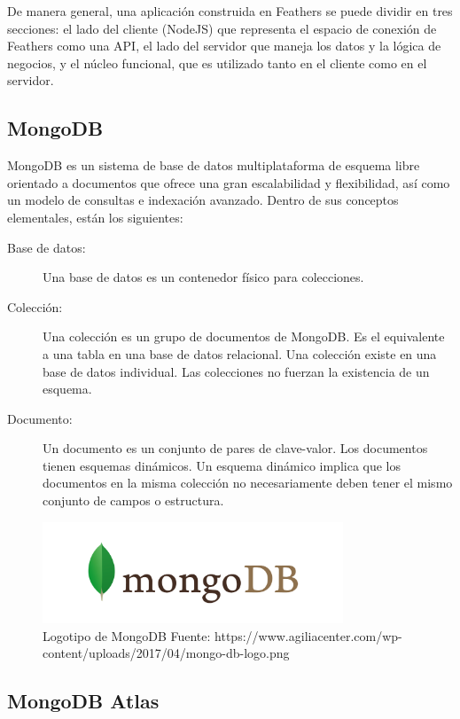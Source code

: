 De manera general, una aplicación construida en Feathers se puede dividir en tres secciones: el lado del cliente (NodeJS) que representa el espacio de conexión de Feathers como una API, el lado del servidor que maneja los datos y la lógica de negocios, y el núcleo funcional, que es utilizado tanto en el cliente como en el servidor.

\subsection{MongoDB}

MongoDB \cite{mongodb} es un sistema de base de datos multiplataforma de esquema libre orientado a documentos que ofrece una gran escalabilidad y flexibilidad, así como un modelo de consultas e indexación avanzado. Dentro de sus conceptos elementales, están los siguientes:

\begin{description}
    \item[Base de datos:] Una base de datos es un contenedor físico para colecciones.
    \item[Colección:] Una colección es un grupo de documentos de MongoDB. Es el equivalente a una tabla en una base de datos relacional. Una colección existe en una base de datos individual. Las colecciones no fuerzan la existencia de un esquema.
    \item[Documento:] Un documento es un conjunto de pares de clave-valor. Los documentos tienen esquemas dinámicos. Un esquema dinámico implica que los documentos en la misma colección no necesariamente deben tener el mismo conjunto de campos o estructura.
\end{description}

\begin{figure}[H]
\centering
\includegraphics[width=0.80\textwidth]{img/10.png}
\caption{Logotipo de MongoDB
Fuente: https://www.agiliacenter.com/wp-content/uploads/2017/04/mongo-db-logo.png}
\label{figure:MongoDBLogo}
\end{figure}


\subsection{MongoDB Atlas}

